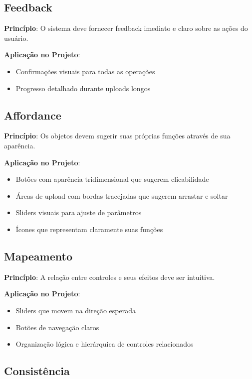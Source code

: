 \subsection{Feedback}

\textbf{Princípio}: O sistema deve fornecer feedback imediato e claro sobre as ações do usuário.

\textbf{Aplicação no Projeto}:
\begin{itemize}
    \item Confirmações visuais para todas as operações
    \item Progresso detalhado durante uploads longos
\end{itemize}

\subsection{Affordance}

\textbf{Princípio}: Os objetos devem sugerir suas próprias funções através de sua aparência.

\textbf{Aplicação no Projeto}:
\begin{itemize}
    \item Botões com aparência tridimensional que sugerem clicabilidade
    \item Áreas de upload com bordas tracejadas que sugerem arrastar e soltar
    \item Sliders visuais para ajuste de parâmetros
    \item Ícones que representam claramente suas funções
\end{itemize}

\subsection{Mapeamento}

\textbf{Princípio}: A relação entre controles e seus efeitos deve ser intuitiva.

\textbf{Aplicação no Projeto}:
\begin{itemize}
    \item Sliders que movem na direção esperada
    \item Botões de navegação claros
    \item Organização lógica e hierárquica de controles relacionados
\end{itemize}

\subsection{Consistência}

